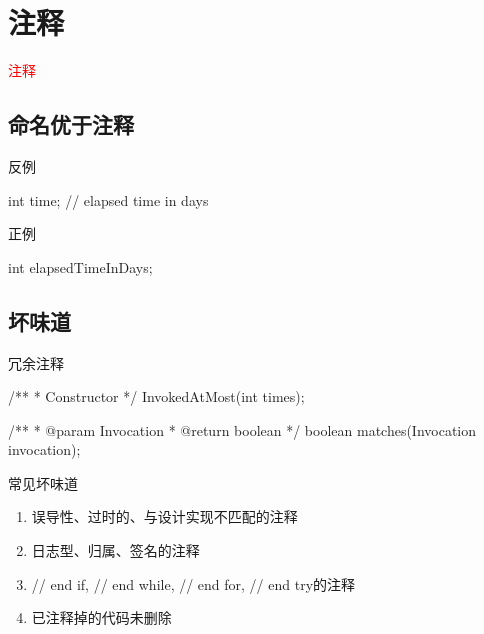 \section{注释}
\label{sec:comment}

\begin{frame}
  \begin{center}
    \Huge{\textcolor{red}{注释}}
  \end{center}
\end{frame}

\subsection{命名优于注释}

\begin{frame}[fragile]{反例}
  \begin{java}
int time; // elapsed time in days  
  \end{java}
\end{frame}

\begin{frame}[fragile]{正例}
  \begin{java}
int elapsedTimeInDays;
  \end{java}
\end{frame}

\subsection{坏味道}

\begin{frame}[fragile]{冗余注释}
\begin{java}
/**
 * Constructor
 */
InvokedAtMost(int times);

/**
 * @param Invocation
 * @return boolean
 */
boolean matches(Invocation invocation);
\end{java}
\end{frame}

\begin{frame}[fragile]{常见坏味道}
\begin{enumerate}
  \item 误导性、过时的、与设计实现不匹配的注释
  \item 日志型、归属、签名的注释
  \item // end if, // end while, // end for, // end try的注释
  \item 已注释掉的代码未删除
\end{enumerate}
\end{frame}

